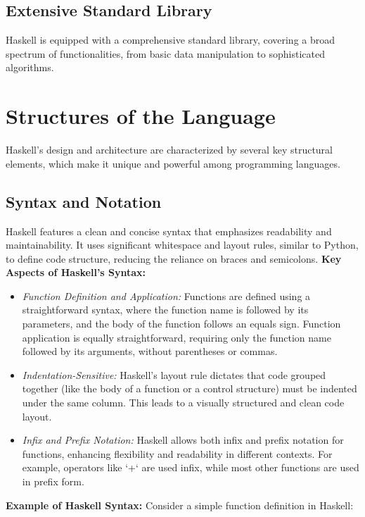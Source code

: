 \documentclass[a4paper, 10pt]{article}
\begin{document}
        \subsection{Extensive Standard Library}
            Haskell is equipped with a comprehensive standard library, covering a broad spectrum of functionalities, from basic data manipulation to sophisticated algorithms.

        \pagebreak

	\section{Structures of the Language}
        Haskell's design and architecture are characterized by several key structural elements, which make it unique and powerful among programming languages.

        \subsection{Syntax and Notation}
            Haskell features a clean and concise syntax that emphasizes readability and maintainability. It uses significant whitespace and layout rules, similar to Python, to define code structure, reducing the reliance on braces and semicolons.
            \textbf{Key Aspects of Haskell's Syntax:}
            \begin{itemize}
                \item \textit{Function Definition and Application:} Functions are defined using a straightforward syntax, where the function name is followed by its parameters, and the body of the function follows an equals sign. Function application is equally straightforward, requiring only the function name followed by its arguments, without parentheses or commas.
                \item \textit{Indentation-Sensitive:} Haskell's layout rule dictates that code grouped together (like the body of a function or a control structure) must be indented under the same column. This leads to a visually structured and clean code layout.
                \item \textit{Infix and Prefix Notation:} Haskell allows both infix and prefix notation for functions, enhancing flexibility and readability in different contexts. For example, operators like `+` are used infix, while most other functions are used in prefix form.
            \end{itemize}

            \textbf{Example of Haskell Syntax:}
            Consider a simple function definition in Haskell:
\end{document}
